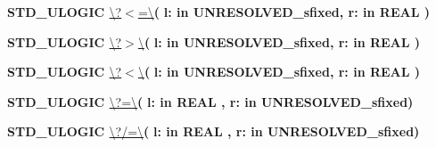\begin{DoxyCompactItemize}
\item 
{\bfseries {\bfseries \textcolor{comment}{S\+T\+D\+\_\+\+U\+L\+O\+G\+I\+C}\textcolor{vhdlchar}{ }}} \hyperlink{classfixed__pkg_a271da29f659a2bc9480dbd29d7727913}{\textbackslash{}?$<$=\textbackslash{}}{\bfseries  ( }{\bfseries \textcolor{vhdlchar}{l\+: }\textcolor{stringliteral}{in }\textcolor{vhdlchar}{U\+N\+R\+E\+S\+O\+L\+V\+E\+D\+\_\+sfixed}}{\bfseries  , \textcolor{vhdlchar}{r\+: }\textcolor{stringliteral}{in }{\bfseries \textcolor{comment}{R\+E\+A\+L}\textcolor{vhdlchar}{ }}}{\bfseries  )} 
\item 
{\bfseries {\bfseries \textcolor{comment}{S\+T\+D\+\_\+\+U\+L\+O\+G\+I\+C}\textcolor{vhdlchar}{ }}} \hyperlink{classfixed__pkg_a9e6b6b8c2c14da978e6f70cb6e85e6dc}{\textbackslash{}?$>$\textbackslash{}}{\bfseries  ( }{\bfseries \textcolor{vhdlchar}{l\+: }\textcolor{stringliteral}{in }\textcolor{vhdlchar}{U\+N\+R\+E\+S\+O\+L\+V\+E\+D\+\_\+sfixed}}{\bfseries  , \textcolor{vhdlchar}{r\+: }\textcolor{stringliteral}{in }{\bfseries \textcolor{comment}{R\+E\+A\+L}\textcolor{vhdlchar}{ }}}{\bfseries  )} 
\item 
{\bfseries {\bfseries \textcolor{comment}{S\+T\+D\+\_\+\+U\+L\+O\+G\+I\+C}\textcolor{vhdlchar}{ }}} \hyperlink{classfixed__pkg_a7e98e66a4a282c529968f69f70dd16ad}{\textbackslash{}?$<$\textbackslash{}}{\bfseries  ( }{\bfseries \textcolor{vhdlchar}{l\+: }\textcolor{stringliteral}{in }\textcolor{vhdlchar}{U\+N\+R\+E\+S\+O\+L\+V\+E\+D\+\_\+sfixed}}{\bfseries  , \textcolor{vhdlchar}{r\+: }\textcolor{stringliteral}{in }{\bfseries \textcolor{comment}{R\+E\+A\+L}\textcolor{vhdlchar}{ }}}{\bfseries  )} 
\item 
{\bfseries {\bfseries \textcolor{comment}{S\+T\+D\+\_\+\+U\+L\+O\+G\+I\+C}\textcolor{vhdlchar}{ }}} \hyperlink{classfixed__pkg_a69151531d87456d952c2073704fa1779}{\textbackslash{}?=\textbackslash{}}{\bfseries  ( }{\bfseries \textcolor{vhdlchar}{l\+: }\textcolor{stringliteral}{in }{\bfseries \textcolor{comment}{R\+E\+A\+L}\textcolor{vhdlchar}{ }}}{\bfseries  , \textcolor{vhdlchar}{r\+: }\textcolor{stringliteral}{in }\textcolor{vhdlchar}{U\+N\+R\+E\+S\+O\+L\+V\+E\+D\+\_\+sfixed}}{\bfseries  )} 
\item 
{\bfseries {\bfseries \textcolor{comment}{S\+T\+D\+\_\+\+U\+L\+O\+G\+I\+C}\textcolor{vhdlchar}{ }}} \hyperlink{classfixed__pkg_a172a73302b09f0d298b93ecda8c5e976}{\textbackslash{}?/=\textbackslash{}}{\bfseries  ( }{\bfseries \textcolor{vhdlchar}{l\+: }\textcolor{stringliteral}{in }{\bfseries \textcolor{comment}{R\+E\+A\+L}\textcolor{vhdlchar}{ }}}{\bfseries  , \textcolor{vhdlchar}{r\+: }\textcolor{stringliteral}{in }\textcolor{vhdlchar}{U\+N\+R\+E\+S\+O\+L\+V\+E\+D\+\_\+sfixed}}{\bfseries  )} 

\end{DoxyCompactItemize}
